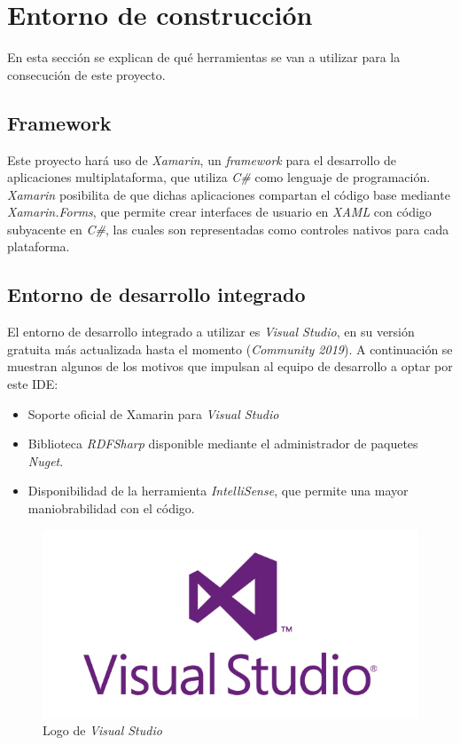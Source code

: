 
\section{Entorno de construcción}
En esta sección se explican de qué herramientas se van a utilizar para la consecución de este proyecto.

\subsection{Framework}
Este proyecto hará uso de \textit{Xamarin}, un \textit{framework} para el desarrollo de aplicaciones multiplataforma, que 
utiliza \textit{C\#} como lenguaje de programación. \textit{Xamarin} posibilita de que dichas aplicaciones 
compartan el código base mediante \textit{Xamarin.Forms}, que permite crear interfaces de usuario en \textit{XAML} con 
código subyacente en \textit{C\#}, las cuales son representadas como controles nativos para cada plataforma.

\subsection{Entorno de desarrollo integrado}
El entorno de desarrollo integrado a utilizar es \textit{Visual Studio}, en su versión gratuita más actualizada hasta el momento
(\textit{Community 2019}). A continuación se muestran algunos de los motivos que impulsan al equipo de desarrollo a optar por este IDE:
\newpage
\begin{itemize}
    \item Soporte oficial de Xamarin para \textit{Visual Studio}
    \item Biblioteca \textit{RDFSharp} disponible mediante el administrador de paquetes \textit{Nuget}.
    \item Disponibilidad de la herramienta \textit{IntelliSense}, que permite una mayor maniobrabilidad con el código.
\end{itemize}

\begin{figure}[H]
    \centering
    \includegraphics[scale=0.2]{Figures/Logo_VisualStudio.png}
    \caption{Logo de \textit{Visual Studio}}
    \label{Logo_VS}
\end{figure}

